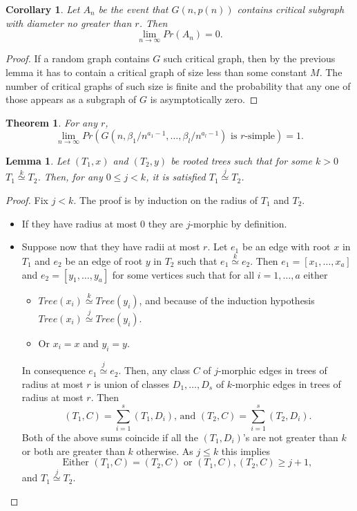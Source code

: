 \documentclass[11pt,notitlepage]{report}
\newtheorem{theorem}{Theorem}[chapter]
\newtheorem{lemma}{Lemma}[chapter]
\newtheorem{corollary}{Corollary}[chapter]
\theoremstyle{definition}
\newcommand{\Ln}{\lim\limits_{n\to \infty}}
\newcommand{\morph}[1]{\stackrel{#1}{\simeq}}
\begin{document}
\begin{corollary}
	Let $A_n$ be the event that $G(n,p(n))$ contains critical 
	subgraph with diameter no greater than $r$. Then
	\[ \Ln Pr(A_n)=0. \]
\end{corollary}
\begin{proof}
	If a random graph contains $G$ such critical graph, then by the previous
	lemma it has to contain a critical graph of size less than some constant $M$.
	The number of critical graphs of such size is finite and the probability 
	that any one of those appears as a subgraph of $G$ is asymptotically zero.	 
\end{proof}


\begin{theorem} For any $r$,
	\[\Ln Pr(G(n,\beta_1/n^{a_1-1}, \dots,\beta_l/n^{a_l-1} ) \text{ is }r \text{-simple})=1 .\]
\end{theorem}

	
\begin{lemma} 
	Let $(T_1,x)$ and $(T_2,y)$ be rooted trees such that for some $k>0$ 
	$T_1 \morph{k} T_2$. Then, for any $0\leq j < k$, it is satisfied
	$T_1 \morph{j} T_2$.
\end{lemma}
\begin{proof}
	Fix $j<k$. The proof is by induction on the radius of $T_1$ and $T_2$.
	\begin{itemize}
		\item If they have radius at most $0$ they are $j$-morphic by definition. 
		\item Suppose now that they have radii at most $r$. Let $e_1$ be an edge with root
		$x$ in $T_1$ and $e_2$ be an edge of root $y$ in $T_2$ such that $e_1 \morph{k} e_2$.
		Then $e_1=[x_1,\dots,x_a]$ and $e_2=[y_1,\dots,y_a]$ for some vertices such that for all
		$i=1,\dots, a$ either 
		\begin{itemize}
			\item $Tree(x_i)\morph{k} Tree(y_i)$, and because of the induction hypothesis 
			$Tree(x_i)\morph{j} Tree(y_i)$. 
			\item Or $x_i=x$ and $y_i=y$.
		\end{itemize}
		In consequence $e_1\morph{j} e_2$. Then, any class $C$ 
		of $j$-morphic edges in trees of radius at most
		$r$ is union of classes $D_1,\dots, D_s$ of $k$-morphic edges in 
		trees of radius at most $r$. Then
		\[(T_1,C)=\sum_{i=1}^s (T_1, D_i) \text{, and }	(T_2,C)=\sum_{i=1}^s (T_2, D_i).\]	
	 	Both of the above sums coincide if all the $(T_1, D_i)$'s are not greater than $k$ or
	 	both are greater than $k$ otherwise. As $j\leq k$ this implies
	 	\[\text{Either }(T_1,C)=(T_2,C) \text{ or } (T_1,C),(T_2,C)\geq j+1 ,\]
	 	and $T_1\morph{j}T_2$. 		
	\end{itemize}
\end{proof}	
\end{document}
